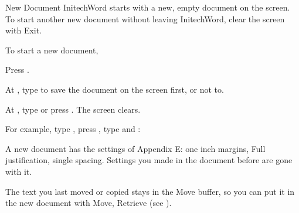 \begin{Feature}{New Document}
InitechWord starts with a new, empty document on the screen.  To start
another new document without leaving InitechWord, clear the screen with
Exit.

To start a new document,
\begin{WPSteps}
\item Press .
\item At , type  to save the document
on the screen first, or  not to.
\item At , type  or press .  The
screen clears.
\end{WPSteps}

For example, type , press
, type  and :
\EndReplay

\Notes
{}
A new document has the settings of Appendix E: one inch margins, Full
justification, single spacing.  Settings you made in the document before
are gone with it.

The text you last moved or copied stays in the Move buffer, so you can put
it in the new document with Move, Retrieve (see ).

\end{Feature}
